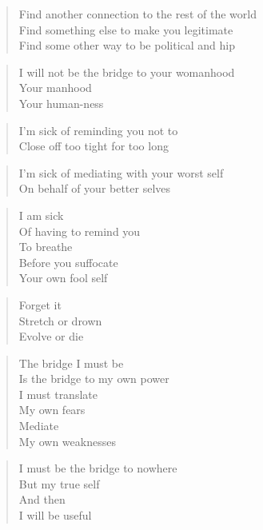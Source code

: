 \documentclass{article}
\begin{document}
\begin{verse}
	Find another connection to the rest of the world \\
	Find something else to make you legitimate \\
	Find some other way to be political and hip
\end{verse}

\begin{verse}
	I will not be the bridge to your womanhood \\
	Your manhood \\
	Your human-ness
\end{verse}

\begin{verse}
	I'm sick of reminding you not to \\
	Close off too tight for too long
\end{verse}

\begin{verse}
	I'm sick of mediating with your worst self \\
	On behalf of your better selves
\end{verse}

\begin{verse}
	I am sick \\
	Of having to remind you \\
	To breathe \\
	Before you suffocate \\
	Your own fool self
\end{verse}

\begin{verse}
	Forget it \\
	Stretch or drown \\
	Evolve or die
\end{verse}

\begin{verse}
	The bridge I must be \\
	Is the bridge to my own power \\
	I must translate \\
	My own fears \\
	Mediate \\
	My own weaknesses
\end{verse}

\begin{verse}
	I must be the bridge to nowhere \\
	But my true self \\
	And then \\
	I will be useful
\end{verse}
\end{document}
